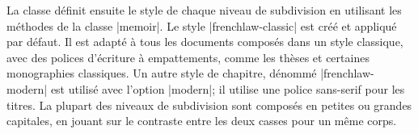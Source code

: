 \begin{noprint}
\newcommand{\subheading}[2][]{
	\begingroup
		\if@article\else\cleardoublepage\fi
		\stepcounter{subheading}
		\renewcommand{\printchaptertitle}{%
			\printsubheadingname%
			\subheadingnamenum\printsubheadingnum%
			\aftersubheadingnum%
			\printsubheadingtitle%
		}
		\clearforchapter
		\thispagestyle{chapter}
		\@schapter{#2}
		\chaptermark{#2}
		\phantomsection
		\addcontentsline{toc}{subheading}{\protect\numberline{\thesubheading}#2}
	\endgroup
}
\end{noprint}

La classe \frenchlaw définit ensuite le style de chaque niveau de subdivision en utilisant les méthodes de la classe |memoir|. Le style |frenchlaw-classic| est créé et appliqué par défaut. Il est adapté à tous les documents composés dans un style classique, avec des polices d'écriture à empattements, comme les thèses et certaines monographies classiques. Un autre style de chapitre, dénommé |frenchlaw-modern| est utilisé avec l'option |modern|; il utilise une police sans-serif pour les titres. La plupart des niveaux de subdivision sont composés en petites ou grandes capitales, en jouant sur le contraste entre les deux casses pour un même corps.

